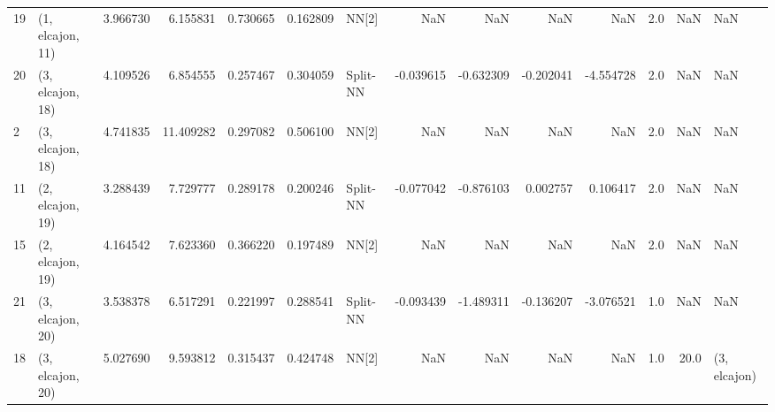 \begin{tabular}{llrrrrlrrrrrrl}
19 &  (1, elcajon, 11) &  3.966730 &   6.155831 &   0.730665 &  0.162809 &       NN[2] &             NaN &           NaN &            NaN &          NaN &            2.0 &    NaN &              NaN \\
20 &  (3, elcajon, 18) &  4.109526 &   6.854555 &   0.257467 &  0.304059 &    Split-NN &       -0.039615 &     -0.632309 &      -0.202041 &    -4.554728 &            2.0 &    NaN &              NaN \\
2  &  (3, elcajon, 18) &  4.741835 &  11.409282 &   0.297082 &  0.506100 &       NN[2] &             NaN &           NaN &            NaN &          NaN &            2.0 &    NaN &              NaN \\
11 &  (2, elcajon, 19) &  3.288439 &   7.729777 &   0.289178 &  0.200246 &    Split-NN &       -0.077042 &     -0.876103 &       0.002757 &     0.106417 &            2.0 &    NaN &              NaN \\
15 &  (2, elcajon, 19) &  4.164542 &   7.623360 &   0.366220 &  0.197489 &       NN[2] &             NaN &           NaN &            NaN &          NaN &            2.0 &    NaN &              NaN \\
21 &  (3, elcajon, 20) &  3.538378 &   6.517291 &   0.221997 &  0.288541 &    Split-NN &       -0.093439 &     -1.489311 &      -0.136207 &    -3.076521 &            1.0 &    NaN &              NaN \\
18 &  (3, elcajon, 20) &  5.027690 &   9.593812 &   0.315437 &  0.424748 &       NN[2] &             NaN &           NaN &            NaN &          NaN &            1.0 &   20.0 &     (3, elcajon) \\
\bottomrule
\end{tabular}
